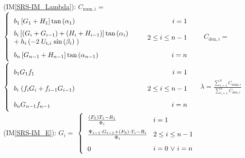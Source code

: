 \documentclass[12pt, titlepage]{article}
\newcommand{\iref}[1]{IM\ref{#1}}
\begin{document}
\begin{itemize}
\begin{itemize}
		(\iref{SRS-IM_Lambda}): \( {C_{\text{num},i}}= \) 
		\(  \left\{
		\renewcommand{\arraystretch}{2}
		\begin{tabular}{ p{6.5cm} r} 
		$ {{b}_{\text{1}}}\left[{{G}_{\text{1}} + {H}_{\text{1}}}
		\right]{\tan\left(\alpha_{\text{1}}\right) } $ &  $
		i={\text{1}} $ \\
		\noindent\parbox[c]{\hsize} {$ {{b}_{i}} \left[
			\left({{G}_{i} + {G}_{i-1}}\right) +
			\left({{H}_{i} + {H}_{i-1}}\right)
			\right]{\tan\left(\alpha_{i}\right)} \\ +
			{{h}_{i}}\left( 
			-{2}\;{U_{\text{t},i}}\;{\sin\left(\beta_{i}\right)}
			\;\right) $}
		&  $ 2\leq i \leq{n-1} $ \\ $
		{{b}_{n}}\left[{{G}_{n-1} +
			{H}_{n-1}}\right]{\tan\left(\alpha_{n-1}\right)
		} $ &  $ i=n $ \\
		\end{tabular} 
		\renewcommand{\arraystretch}{1}
		\right. \)
		~\newline~\newline
		\( {C_{\text{den},i}}= \)
		\(  \left\{
		\renewcommand{\arraystretch}{2}
		\begin{tabular}{ p{6.5cm} r} 
		$ {{b}_{\text{1}}}{{G}_{\text{1}}}{f_{\text{1}}} $ &  $
		i=\text{1} $ \\ $ {{b}_{i}}\;{\left({
				{f_{i}}{{G}_{i}} +
				{f_{i-1}}{{G}_{i-1}} }\right)} $ &  $
		2\leq i \leq{n-1} $ \\ $
		{{b}_{n}}{{G}_{n-1}}{f_{n-1}} $ &  $
		i=n $ \\
		\end{tabular} 
		\renewcommand{\arraystretch}{1}
		\right. \) 
		~\newline
		\( \lambda= \frac{ \displaystyle\sum_{i=1}^{n} {C_{\text{num},i}}}
		{\displaystyle\sum_{i=1}^{n} {C_{\text{den},i}}} \) \\
		
		(\iref{SRS-IM_E}): \( G_{i}= \) 
		\(  \left\{
		\renewcommand{\arraystretch}{1.75}
		\begin{tabular}{ p{3cm} l} 
		$ \frac{ \left(F_\text{S}\right) T_{\text{1}} - R_{\text{1}} }{
			\Phi_{i} } $ &  $i=1$ \\
		\noindent\parbox[c]{\hsize} {$ \frac{ \Psi_{i-1} \cdot
				G_{i-1} + \left(F_\text{S}\right) \cdot T_{i} -
				R_{i} }{ \Phi_{i} } $} & 
		$2\leq i \leq n-1$ \\
		\noindent\parbox[c]{\hsize} {$0 $} &  $i=0$ $\lor$ $i=n$
		\end{tabular}
		\renewcommand{\arraystretch}{1}
		\right. \) \\
		

\end{itemize}
\end{itemize}
\end{document}
